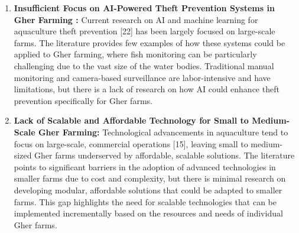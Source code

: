 \documentclass[conference]{IEEEtran}
\begin{document}
\begin{enumerate}
	\item \textbf{ Insufficient Focus on AI-Powered Theft Prevention Systems in Gher Farming : }
Current research on AI and machine learning for aquaculture theft prevention [22] has been largely focused on large-scale farms. The literature provides few examples of how these systems could be applied to Gher farming, where fish monitoring can be particularly challenging due to the vast size of the water bodies. Traditional manual monitoring and camera-based surveillance are labor-intensive and have limitations, but there is a lack of research on how AI could enhance theft prevention specifically for Gher farms.	
	
	\item \textbf{Lack of Scalable and Affordable Technology for Small to Medium-Scale Gher Farming: }
Technological advancements in aquaculture tend to focus on large-scale, commercial operations [15], leaving small to medium-sized Gher farms underserved by affordable, scalable solutions. The literature points to significant barriers in the adoption of advanced technologies in smaller farms due to cost and complexity, but there is minimal research on developing modular, affordable solutions that could be adapted to smaller farms. This gap highlights the need for scalable technologies that can be implemented incrementally based on the resources and needs of individual Gher farms.
\end{enumerate}
\end{document}
